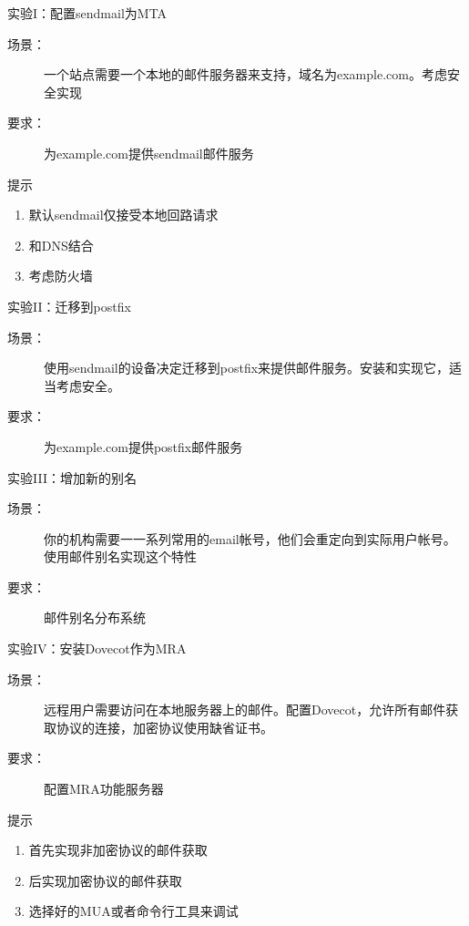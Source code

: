 \begin{frame}{实验I：配置sendmail为MTA}
\begin{description}
\item [{场景：}] 一个站点需要一个本地的邮件服务器来支持，域名为example.com。考虑安全实现
\item [{要求：}] 为example.com提供sendmail邮件服务
\end{description}
提示
\begin{enumerate}
\item 默认sendmail仅接受本地回路请求
\item 和DNS结合
\item 考虑防火墙
\end{enumerate}

\end{frame} 
\begin{frame}{实验II：迁移到postfix}
\begin{description}
\item [{场景：}] 使用sendmail的设备决定迁移到postfix来提供邮件服务。安装和实现它，适当考虑安全。
\item [{要求：}] 为example.com提供postfix邮件服务
\end{description}

\end{frame} 
\begin{frame}{实验III：增加新的别名}
\begin{description}
\item [{场景：}] 你的机构需要一一系列常用的email帐号，他们会重定向到实际用户帐号。使用邮件别名实现这个特性
\item [{要求：}] 邮件别名分布系统
\end{description}

\end{frame} 
\begin{frame}{实验IV：安装Dovecot作为MRA}
\begin{description}
\item [{场景：}] 远程用户需要访问在本地服务器上的邮件。配置Dovecot，允许所有邮件获取协议的连接，加密协议使用缺省证书。
\item [{要求：}] 配置MRA功能服务器
\end{description}
提示
\begin{enumerate}
\item 首先实现非加密协议的邮件获取
\item 后实现加密协议的邮件获取
\item 选择好的MUA或者命令行工具来调试
\end{enumerate}

\end{frame} 
